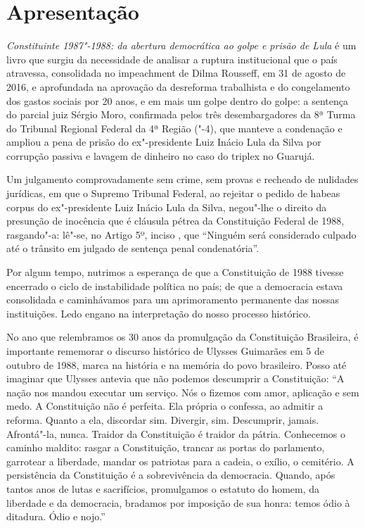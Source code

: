 \chapter{Apresentação}%

\emph{Constituinte 1987"-1988: da abertura democrática ao golpe e prisão de Lula} é um livro
que surgiu da necessidade de analisar a ruptura institucional que o país
atravessa, consolidada no impeachment de Dilma Rousseff, em 31 de agosto de
2016, e aprofundada na aprovação da desreforma
trabalhista e do congelamento dos gastos sociais por 20
anos, e em mais um golpe dentro do golpe: a sentença do parcial juiz Sérgio
Moro, confirmada pelos três desembargadores da 8ª Turma do Tribunal Regional Federal da
4ª Região ("-4), que manteve a condenação e ampliou
a pena de prisão do ex"-presidente Luiz Inácio Lula da Silva por corrupção passiva e lavagem
de dinheiro no caso do triplex no Guarujá.

Um julgamento comprovadamente sem crime, sem provas e recheado de nulidades jurídicas, em que
o Supremo Tribunal Federal, ao rejeitar o pedido de habeas corpus do ex"-presidente Luiz Inácio
Lula da Silva, negou"-lhe o direito da presunção de inocência que é cláusula
pétrea da Constituição Federal de 1988, rasgando"-a: lê"-se, no Artigo 5º, inciso
, que ``Ninguém será considerado culpado até o trânsito em julgado de sentença
penal condenatória''.

Por algum tempo, nutrimos a esperança de que a Constituição de 1988 tivesse encerrado
o ciclo de instabilidade política no país; de que a democracia
estava consolidada e caminhávamos para um aprimoramento
permanente das nossas instituições. Ledo engano na interpretação do
nosso processo histórico.

No ano que relembramos os 30 anos da promulgação da Constituição Brasileira,
é importante rememorar o discurso histórico de Ulysses Guimarães em 5 de
outubro de 1988, marca na história e na memória do povo brasileiro. Posso
até imaginar que Ulysses antevia que não podemos descumprir a Constituição:
``A nação nos mandou executar um serviço. Nós o fizemos com amor, aplicação e sem medo. A
Constituição não é perfeita. Ela própria o confessa, ao admitir a reforma. Quanto a ela,
discordar sim. Divergir, sim. Descumprir, jamais. Afrontá"-la, nunca. Traidor da Constituição
é traidor da pátria. Conhecemos o caminho maldito: rasgar a Constituição, trancar as portas
do parlamento, garrotear a liberdade, mandar os patriotas para a cadeia, o exílio, o cemitério.
A persistência da Constituição é a sobrevivência da democracia. Quando, após tantos anos de
lutas e sacrifícios, promulgamos o estatuto do homem, da liberdade e da democracia, bradamos
por imposição de sua honra: temos ódio à ditadura. Ódio e nojo.''


